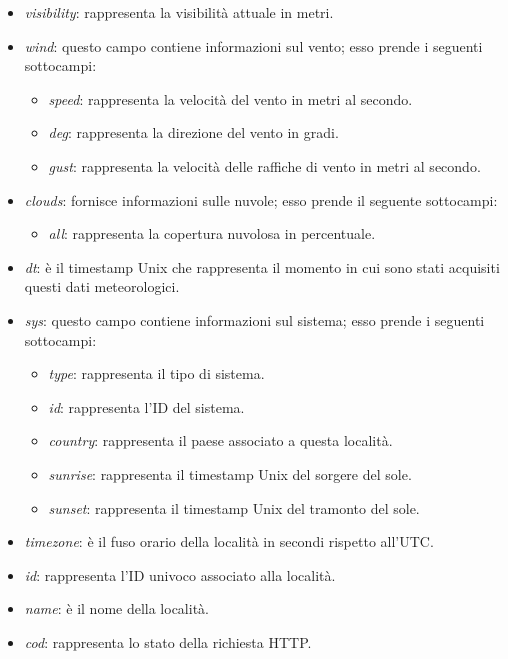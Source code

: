 \begin{itemize}
    \item \textit{visibility}: rappresenta la visibilità attuale in metri.
    \item \textit{wind}: questo campo contiene informazioni sul vento; esso prende i seguenti sottocampi:
    \begin{itemize}
        \item \textit{speed}: rappresenta la velocità del vento in metri al secondo.
        \item \textit{deg}: rappresenta la direzione del vento in gradi.
        \item \textit{gust}: rappresenta la velocità delle raffiche di vento in metri al secondo.
    \end{itemize}
    
    \item \textit{clouds}: fornisce informazioni sulle nuvole; esso prende il seguente sottocampi:
    \begin{itemize}
        \item \textit{all}: rappresenta la copertura nuvolosa in percentuale.
    \end{itemize}
        
    \item \textit{dt}: è il timestamp Unix che rappresenta il momento in cui sono stati acquisiti questi dati meteorologici.
    \item \textit{sys}: questo campo contiene informazioni sul sistema; esso prende i seguenti sottocampi:
    \begin{itemize}
        \item \textit{type}: rappresenta il tipo di sistema.
        \item \textit{id}: rappresenta l'ID del sistema.
        \item \textit{country}: rappresenta il paese associato a questa località.
        \item \textit{sunrise}: rappresenta il timestamp Unix del sorgere del sole.
        \item \textit{sunset}: rappresenta il timestamp Unix del tramonto del sole.
    \end{itemize}
        
    \item \textit{timezone}: è il fuso orario della località in secondi rispetto all'UTC. 
    \item \textit{id}: rappresenta l'ID univoco associato alla località.
    \item \textit{name}: è il nome della località.
    \item \textit{cod}: rappresenta lo stato della richiesta HTTP.
\end{itemize}

